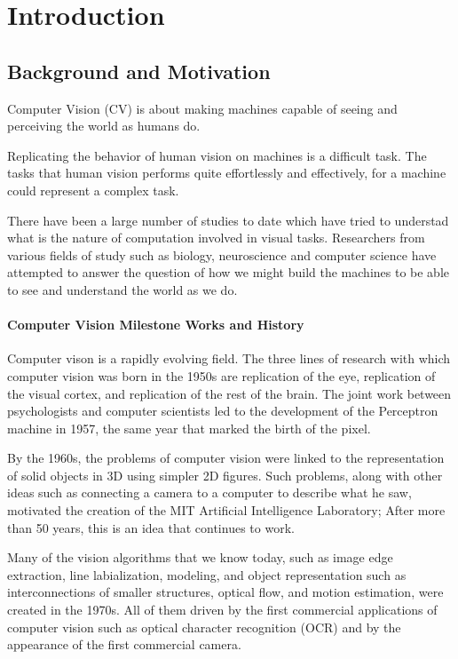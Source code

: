 \chapter{Introduction}
\section{Background and Motivation}
Computer Vision (CV) is about making machines capable of seeing and perceiving the world as humans do.

Replicating the behavior of human vision on machines is a difficult task. The tasks that human vision performs  quite effortlessly and effectively, for a machine could represent a complex task.

There have been a large number of studies to date which have tried to understad what is the nature of computation involved in visual tasks. Researchers from various fields of study such as biology, neuroscience and computer science have attempted to answer the question of how we might build the machines to be able to see and understand the world as we do.


\subsubsection{Computer Vision Milestone Works and History}
Computer vison is a rapidly evolving field. The three lines of research with which computer vision was born in the 1950s are replication of the eye, replication of the visual cortex, and replication of the rest of the brain. The joint work between psychologists and computer scientists led to the development of the Perceptron machine in 1957, the same year that marked the birth of the pixel.

By the 1960s, the problems of computer vision were linked to the representation of solid objects in 3D using simpler 2D figures. Such problems, along with other ideas such as connecting a camera to a computer to describe what he saw, motivated the creation of the MIT Artificial Intelligence Laboratory; After more than 50 years, this is an idea that continues to work.

Many of the vision algorithms that we know today, such as image edge extraction, line labialization, modeling, and object representation such as interconnections of smaller structures, optical flow, and motion estimation, were created in the 1970s. All of them driven by the first commercial applications of computer vision such as optical character recognition (OCR) and by the appearance of the first commercial camera.

